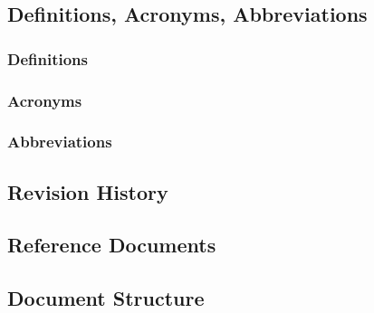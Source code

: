 \subsection{Definitions, Acronyms, Abbreviations}
\subsubsection{Definitions}
\subsubsection{Acronyms}
\subsubsection{Abbreviations}

\subsection{Revision History}

\subsection{Reference Documents}

\subsection{Document Structure}